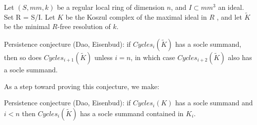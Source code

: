 Let $(S, mm, k)$ be a regular local ring of dimension $n$, and $I\subset mm^3$ an ideal. Set R = S/I.
Let $K$ be the Koszul complex of the maximal ideal in $R$ , and let $\widetilde K$ be the 
minimal $R$-free resolution of $k$. 

Persistence conjecture (Dao, Eisenbud): if $Cycles_i(\widetilde K)$ has a socle summand, then so does 
$Cycles_{i+1}(\widetilde K)$ unless $i=n$, in which case $Cycles_{i+2}(\widetilde K)$ also has a socle summand.

As a step toward proving this conjecture, we make:

Persistence conjecture (Dao, Eisenbud): if $Cycles_i(K)$ has a socle summand and $i<n$ then  
$Cycles_i(\widetilde K)$ has a socle summand  contained in $K_i$.
